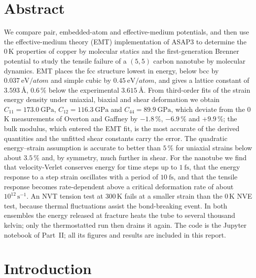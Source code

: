\documentclass[11pt,a4paper]{article}
\numberwithin{equation}{section}
\theoremstyle{remark}
\begin{document}
\section*{Abstract}
  We compare pair, embedded-atom and effective-medium potentials, and then use the effective-medium
  theory (EMT) implementation of ASAP3 to determine the 0\,K properties of copper by molecular
  statics and the first-generation Brenner potential to study the tensile failure of a $(5,5)$ carbon
  nanotube by molecular dynamics. EMT places the fcc structure lowest in energy, below bcc by
  $\SI{0.037}{\electronvolt\per atom}$ and simple cubic by $\SI{0.45}{\electronvolt\per atom}$, and
  gives a lattice constant of $\SI{3.593}{\angstrom}$, $0.6\,\%$ below the experimental
  $\SI{3.615}{\angstrom}$. From third-order fits of the strain energy density under uniaxial, biaxial
  and shear deformation we obtain $C_{11} = \SI{173.0}{\giga\pascal}$,
  $C_{12} = \SI{116.3}{\giga\pascal}$ and $C_{44} = \SI{89.9}{\giga\pascal}$, which deviate from the
  0\,K measurements of Overton and Gaffney by $-1.8\,\%$, $-6.9\,\%$ and $+9.9\,\%$; the bulk modulus,
  which entered the EMT fit, is the most accurate of the derived quantities and the unfitted shear
  constants carry the error. The quadratic energy--strain assumption is accurate to better than $5\,\%$
  for uniaxial strains below about $3.5\,\%$ and, by symmetry, much further in shear. For the nanotube
  we find that velocity-Verlet conserves energy for time steps up to $\SI{1}{\femto\second}$, that the
  energy response to a step strain oscillates with a period of $\SI{10}{\femto\second}$, and that the
  tensile response becomes rate-dependent above a critical deformation rate of about
  $10^{12}\,\mathrm{s^{-1}}$. An NVT tension test at 300\,K fails at a smaller strain than the 0\,K NVE
  test, because thermal fluctuations assist the bond-breaking event. In both ensembles the energy
  released at fracture heats the tube to several thousand kelvin; only the thermostatted run then
  drains it again. The code is the Jupyter notebook of Part~II; all its figures and results are
  included in this report.

\tableofcontents
\clearpage

\section{Introduction}\label{sec:intro}
\end{document}
